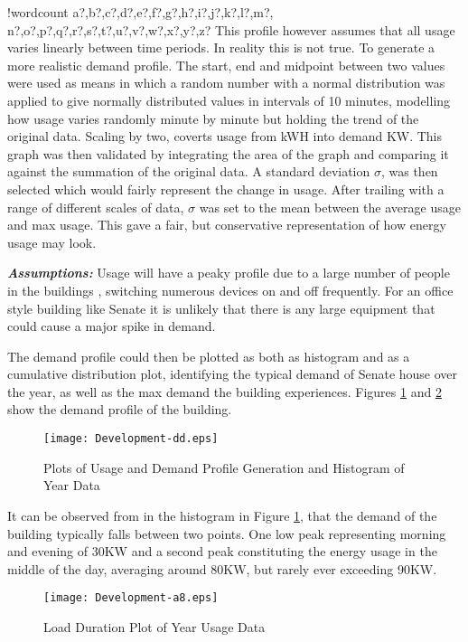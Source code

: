 \documentclass[fontsize=9.5pt]{extarticle}
\numberwithin{figure}{section} %
\newcounter{words}
\newenvironment{counted}{%
  \setcounter{words}{0}
  \SearchList!{wordcount}{\stepcounter{words}}
    {a?,b?,c?,d?,e?,f?,g?,h?,i?,j?,k?,l?,m?,
    n?,o?,p?,q?,r?,s?,t?,u?,v?,w?,x?,y?,z?}
  \UndoBoundary{'}
  \SearchOrder{p;}}{%
  \StopSearching}
\begin{document}
\begin{counted}
This profile however assumes that all usage varies linearly between time
periods. In reality this is not true. To generate a more realistic
demand profile. The start, end and midpoint between two values were used
as means in which a random number with a normal distribution was applied
to give normally distributed values in intervals of 10 minutes,
modelling how usage varies randomly minute by minute but holding the
trend of the original data. Scaling by two, coverts usage from kWH into
demand KW. This graph was then validated by integrating the area of the
graph and comparing it against the summation of the original data. A
standard deviation \(\sigma\), was then selected which would fairly
represent the change in usage. After trailing with a range of different
scales of data, \(\sigma\) was set to the mean between the average usage
and max usage. This gave a fair, but conservative representation of how
energy usage may look.

\textbf{\emph{Assumptions:}} Usage will have a peaky profile due to a
large number of people in the buildings , switching numerous devices on
and off frequently. For an office style building like Senate it is
unlikely that there is any large equipment that could cause a major
spike in demand.

The demand profile could then be plotted as both as histogram and as a
cumulative distribution plot, identifying the typical demand of Senate
house over the year, as well as the max demand the building experiences.
Figures \ref{Development-dd} and \ref{Development-a8} show the demand
profile of the building.

\begin{figure}[H]
 \centering
 \texttt{[image: Development-dd.eps]}
 \caption{Plots of Usage and Demand Profile Generation and Histogram of Year Data}
 \label{Development-dd}
 \end{figure}

It can be observed from in the histogram in Figure \ref{Development-dd},
that the demand of the building typically falls between two points. One
low peak representing morning and evening of 30KW and a second peak
constituting the energy usage in the middle of the day, averaging around
80KW, but rarely ever exceeding 90KW.

\begin{figure}[H]
 \centering
 \texttt{[image: Development-a8.eps]}
 \caption{Load Duration Plot of Year Usage Data}
 \label{Development-a8}
 \end{figure}


\end{counted}
\end{document}

